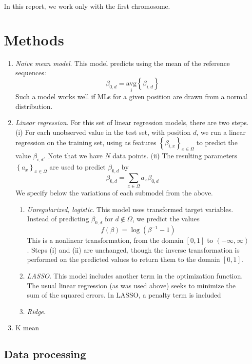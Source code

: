\documentclass{article} %
\begin{document}
In this report, we work only with the first chromosome.

\section{Methods}

\begin{enumerate}

\item \emph{Naive mean model}. This model predicts using the mean of the reference sequences:
\[ \beta_{0,d} = \underset{i}{\text{avg}} \left\{ \beta_{i,d}\right\}\]
Such a model works well if MLs for a given position are drawn from a normal distribution.
\item \emph{Linear regression}. For this set of linear regression models, there are two steps. (i) For each unobserved value in the test set, with position $d$, we run a linear regression on the training set, using as features $\left\{ \beta_{i,x} \right\}_{x \in \Omega}$ to predict the value $\beta_{i,d}$. Note that we have $N$ data points. (ii) The resulting parameters $\left\{ a_x\right\}_{x \in \Omega}$ are used to predict $\beta_{0,d}$ by
\[ \beta_{0,d} = \sum_{x \in \Omega} a_x \beta_{0,d}\]
We specify below the variations of each submodel from the above.
\begin{enumerate}
\item \emph{Unregularized, logistic}. This model uses transformed target variables. Instead of predicting $\beta_{0,d}$ for $d \notin \Omega$, we predict the values
\[ f(\beta) = \log \left(\beta^{-1} -1 \right)\]
This is a nonlinear transformation, from the domain $[0,1]$ to $(-\infty,\infty)$. Steps (i) and (ii) are unchanged, though the inverse transformation is performed on the predicted values to return them to the domain $[0,1]$.
\item \emph{LASSO}. This model includes another term in the optimization function. The usual linear regression (as was used above) seeks to minimize the sum of the squared errors. In LASSO, a penalty term is included 
\item \emph{Ridge}.
\end{enumerate}
\item K mean
\end{enumerate}

\subsection{Data processing}
\end{document}
